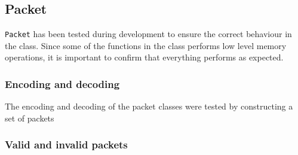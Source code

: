 \subsection{Packet}
\texttt{Packet} has been tested during development to ensure the correct behaviour in the class. Since some of the functions in the class performs low level memory operations, it is important to confirm that everything performs as expected.

\subsubsection*{Encoding and decoding}
The encoding and decoding of the packet classes were tested by constructing a set of packets

\subsubsection*{Valid and invalid packets}